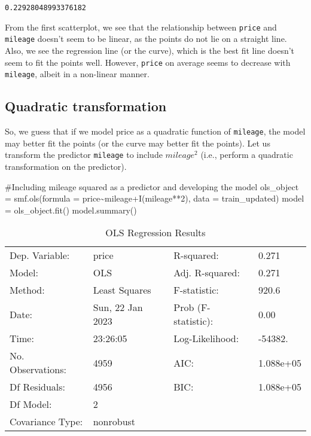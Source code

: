 \documentclass[
  letterpaper,
  DIV=11,
  numbers=noendperiod]{scrreprt}
\newenvironment{Shaded}{\begin{snugshade}}{\end{snugshade}}
\newcommand{\CommentTok}[1]{\textcolor[rgb]{0.37,0.37,0.37}{#1}}
\newcommand{\NormalTok}[1]{\textcolor[rgb]{0.00,0.23,0.31}{#1}}
\newcommand{\OperatorTok}[1]{\textcolor[rgb]{0.37,0.37,0.37}{#1}}
\newcommand{\StringTok}[1]{\textcolor[rgb]{0.13,0.47,0.30}{#1}}
\begin{document}
\begin{verbatim}
0.22928048993376182
\end{verbatim}

From the first scatterplot, we see that the relationship between
\texttt{price} and \texttt{mileage} doesn't seem to be linear, as the
points do not lie on a straight line. Also, we see the regression line
(or the curve), which is the best fit line doesn't seem to fit the
points well. However, \texttt{price} on average seems to decrease with
\texttt{mileage}, albeit in a non-linear manner.

\subsection{Quadratic transformation}\label{quadratic-transformation}

So, we guess that if we model price as a quadratic function of
\texttt{mileage}, the model may better fit the points (or the curve may
better fit the points). Let us transform the predictor \texttt{mileage}
to include \(mileage^2\) (i.e., perform a quadratic transformation on
the predictor).

\begin{Shaded}
\begin{Highlighting}[]
\CommentTok{\#Including mileage squared as a predictor and developing the model}
\NormalTok{ols\_object }\OperatorTok{=}\NormalTok{ smf.ols(formula }\OperatorTok{=} \StringTok{\textquotesingle{}price\textasciitilde{}mileage+I(mileage**2)\textquotesingle{}}\NormalTok{, data }\OperatorTok{=}\NormalTok{ train\_updated)}
\NormalTok{model }\OperatorTok{=}\NormalTok{ ols\_object.fit()}
\NormalTok{model.summary()}
\end{Highlighting}
\end{Shaded}

\begin{longtable}[]{@{}llll@{}}
\caption{OLS Regression Results}\tabularnewline
\toprule\noalign{}
\endfirsthead
\endhead
\bottomrule\noalign{}
\endlastfoot
Dep. Variable: & price & R-squared: & 0.271 \\
Model: & OLS & Adj. R-squared: & 0.271 \\
Method: & Least Squares & F-statistic: & 920.6 \\
Date: & Sun, 22 Jan 2023 & Prob (F-statistic): & 0.00 \\
Time: & 23:26:05 & Log-Likelihood: & -54382. \\
No. Observations: & 4959 & AIC: & 1.088e+05 \\
Df Residuals: & 4956 & BIC: & 1.088e+05 \\
Df Model: & 2 & & \\
Covariance Type: & nonrobust & & \\
\end{longtable}
\end{document}
